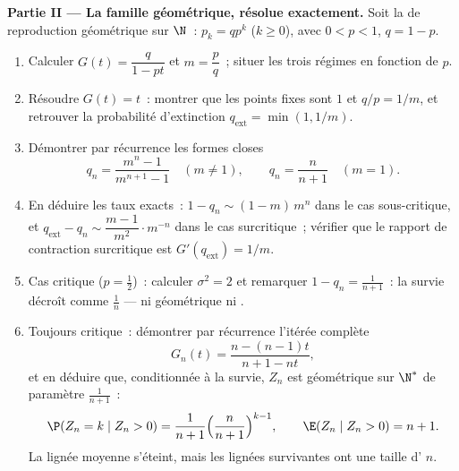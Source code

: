 \begin{problem}
\medskip
\noindent\textbf{Partie II --- La famille géométrique, résolue
exactement.} Soit la  de reproduction géométrique sur $\N$~: $p_k =
qp^k$ ($k \geq 0$), avec $0 < p < 1$, $q = 1 - p$.
\begin{enumerate}[resume]
  \item Calculer $G(t) = \dfrac{q}{1 - pt}$ et $m = \dfrac
        pq$~; situer les trois régimes en fonction de $p$.
  \item Résoudre $G(t) = t$~: montrer que les points fixes sont $1$ et
        $q/p = 1/m$, et retrouver la probabilité d'extinction
        $q_{\mathrm{ext}} = \min(1, 1/m)$.
  \item Démontrer par récurrence les formes closes
        \[
        q_n = \frac{m^n - 1}{m^{n+1} - 1} \quad (m \neq 1),
        \qquad
        q_n = \frac{n}{n+1} \quad (m = 1).
        \]
  \item En déduire les taux exacts~: $1 - q_n \sim (1 - m)\,m^n$
        dans le cas sous-critique, et $q_{\mathrm{ext}} - q_n
        \sim \dfrac{m - 1}{m^{2}}\cdot m^{-n}$ dans le
        cas surcritique~; vérifier que le rapport de contraction
        surcritique est $G'(q_{\mathrm{ext}}) = 1/m$.
  \item Cas critique ($p = \tfrac12$)~: calculer $\sigma^2 =
        2$ et remarquer $1 - q_n = \frac1{n+1}$~: la survie décroît
        comme $\frac1n$ --- ni géométrique ni .
  \item Toujours critique~: démontrer par récurrence l'itérée complète
        \[
        G_n(t) = \frac{n - (n-1)t}{n + 1 - nt},
        \]
        et en déduire que, conditionnée à la survie, $Z_n$ est
        géométrique sur $\N^*$ de paramètre $\frac1{n+1}$~:
        \[
        \P(Z_n = k \mid Z_n > 0) = \frac1{n+1}
        \Bigl(\frac{n}{n+1}\Bigr)^{k-1},
        \qquad
        \E(Z_n \mid Z_n > 0) = n + 1 .
        \]
        La lignée moyenne s'éteint, mais les lignées survivantes ont
        une taille d' $n$.
\end{enumerate}


\end{problem}
